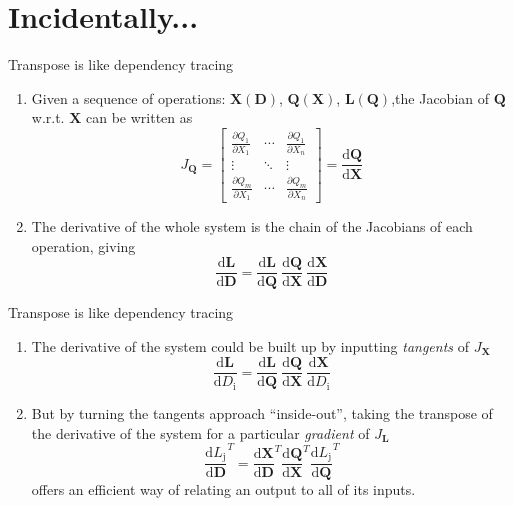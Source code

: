 \documentclass[xcolor=dvipsnames]{beamer}
\newcommand{\mrm}[1]{\mathrm{#1}}
\newcommand{\bsym}[1]{\boldsymbol{#1}}
\begin{document}
\section{Incidentally...}


\begin{frame}{Transpose is like dependency tracing}
  \begin{enumerate}
\item Given a sequence of operations: $\bsym{X}(\bsym{D})$, $\bsym{Q}(\bsym{X})$, $\bsym{L}(\bsym{Q})$,\newline the Jacobian of $\bsym{Q}$ w.r.t. $\bsym{X}$ can be written as
\begin{equation*}
  J_{\bsym{Q}} =
\begin{bmatrix}
  \frac{\partial Q_1}{\partial X_1} & \cdots & \frac{\partial Q_1}{\partial X_n} \\
  \vdots & \ddots & \vdots \\
  \frac{\partial Q_m}{\partial X_1} & \cdots & \frac{\partial Q_m}{\partial X_n}
 \end{bmatrix}
= \frac{\mrm{d} \bsym{Q}}{\mrm{d} \bsym{X}}
\end{equation*}
\item The derivative of the whole system is the chain of the Jacobians of each operation, giving
\begin{equation*}
  \frac{\mrm{d} \bsym{L}}{\mrm{d} \bsym{D}} = \frac{\mrm{d} \bsym{L}}{\mrm{d} \bsym{Q}} \: \frac{\mrm{d} \bsym{Q}}{\mrm{d} \bsym{X}} \: \frac{\mrm{d} \bsym{X}}{\mrm{d} \bsym{D}}
\end{equation*}
  \end{enumerate}
\end{frame}


\begin{frame}{Transpose is like dependency tracing}
  \begin{enumerate}
\item The derivative of the system could be built up by inputting \emph{tangents} of $J_{\bsym{X}}$
\begin{equation*}
  \frac{\mrm{d} \bsym{L}}{\mrm{d} D_{\mrm{i}}} = \frac{\mrm{d} \bsym{L}}{\mrm{d} \bsym{Q}} \: \frac{\mrm{d} \bsym{Q}}{\mrm{d} \bsym{X}} \: \frac{\mrm{d} \bsym{X}}{\mrm{d} D_{\mrm{i}}}
\end{equation*}

\item But by turning the tangents approach ``inside-out'', taking the transpose of the derivative of the system for a particular \emph{gradient} of $J_{\bsym{L}}$
\begin{equation*} \label{eqn:senstivity-transposed}
  \frac{\mrm{d} L_{\mrm{j}}}{\mrm{d} \bsym{D}}^T = \frac{\mrm{d} \bsym{X}}{\mrm{d} \bsym{D}}^T \frac{\mrm{d} \bsym{Q}}{\mrm{d} \bsym{X}}^T \frac{\mrm{d} L_{\mrm{j}}}{\mrm{d} \bsym{Q}}^T
\end{equation*}
offers an efficient way of relating an output to all of its inputs.
  \end{enumerate}
\end{frame}
\end{document}
